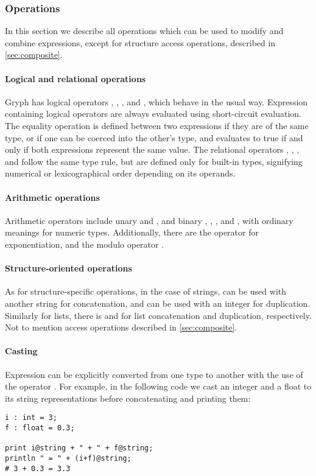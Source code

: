 \subsubsection{Operations}
\label{sec:operations}
In this section we describe all operations which can be used to modify and combine expressions, except for structure access operations, described in \autoref{sec:composite}.

\paragraph{Logical and relational operations}
Gryph has logical operators , , , and , which behave in the usual way. Expression containing logical operators are always evaluated using short-circuit evaluation. The equality operation \key{==} is defined between two expressions if they are of the same type, or if one can be coerced into the other's type, and evaluates to true if and only if both expressions represent the same value. The relational operators \key{<}, \key{>}, \key{<=}, and \key{>=} follow the same type rule, but are defined only for built-in types, signifying numerical or lexicographical order depending on its operands.
\paragraph{Arithmetic operations}
Arithmetic operators include unary \key{-} and \key{+}, and binary \key{+}, \key{-}, \key{*}, and \key{/}, with ordinary meanings for numeric types. Additionally, there are the \key{\^} operator for exponentiation, and the modulo operator \key{\%}.
\paragraph{Structure-oriented operations}
As for structure-specific operations, in the case of strings, \key{+} can be used with another string for concatenation, and \key{*} can be used with an integer for duplication. Similarly for lists, there is \key{++} and \key{**} for list concatenation and duplication, respectively. Not to mention access operations described in \autoref{sec:composite}.

\paragraph{Casting}
\label{sec:casting}
Expression can be explicitly converted from one type to another with the use of the operator . For example, in the following code we cast an integer and a float to its string representations before concatenating and printing them:
\begin{lstlisting}[language=Gryph]
i : int = 3;
f : float = 0.3;

print i@string + " + " + f@string;
println " = " + (i+f)@string;
# 3 + 0.3 = 3.3
\end{lstlisting}